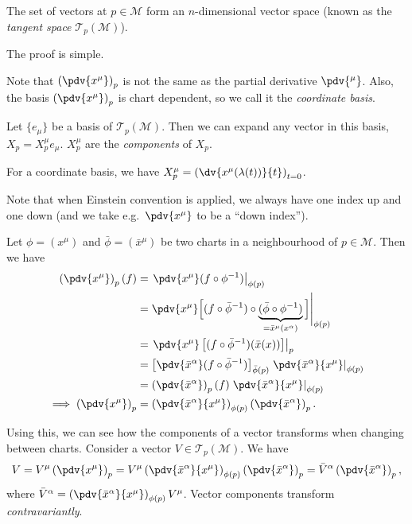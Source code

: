 \documentclass{jknotes}
\begin{document}
\begin{lemma}
    The set of vectors at \(p\in\mathcal{M}\) form an \(n\)-dimensional vector space (known as the \emph{tangent space} \(\mathcal{T}_p(\mathcal{M})\)).
\end{lemma}
The proof is simple.

Note that \(\left(\pdv{x^\mu}\right)_p\) is not the same as the partial derivative \(\pdv{^\mu}\). Also, the basis \(\left(\pdv{x^\mu}\right)_p\) is chart dependent, so we call it the \emph{coordinate basis}.

\begin{defn}
    Let \(\{e_\mu\}\) be a basis of \(\mathcal{T}_p(\mathcal{M})\). Then we can expand any vector in this basis, \(X_p = X_p^\mu e_\mu\). \(X_p^\mu\) are the \emph{components} of \(X_p\).
\end{defn}
\begin{eg}
    For a coordinate basis, we have \(X_p^\mu = \left(\dv{x^\mu(\lambda(t))}{t}\right)_{t=0}\).
\end{eg}
Note that when Einstein convention is applied, we always have one index up and one down (and we take e.g.\ \(\pdv{x^\mu}\) to be a ``down index'').

Let \(\phi=(x^\mu)\) and \(\bar\phi = (\bar{x}^\mu)\) be two charts in a neighbourhood of \(p\in \mathcal{M}\). Then we have
\begin{align}
    \left(\pdv{x^\mu}\right)_p(f) &= \left.\pdv{x^\mu}(f\circ\phi^{-1})\right|_{\phi(p)} \\
                                  &= \pdv{x^\mu}\Big[(f\circ\bar\phi^{-1})\circ\underbrace{(\bar\phi\circ\phi^{-1})}_{=\bar{x}^\mu(x^\alpha)}\Big]\Bigg|_{\phi(p)} \\
                                  &= \left.\pdv{x^\mu}\left[(f\circ\bar\phi^{-1})(\bar{x}(x))\right]\right|_{p} \\
                                  &= \left[\pdv{\bar{x}^\alpha}(f\circ\bar\phi^{-1})\right]_{\bar\phi(p)}\left.\pdv{\bar{x}^\alpha}{x^\mu}\right|_{\phi(p)} \\
                                  &= \left(\pdv{\bar{x}^\alpha}\right)_p(f) \left.\pdv{\bar{x}^\alpha}{x^\mu}\right|_{\phi(p)} \\
    \implies \left(\pdv{x^\mu}\right)_p &= \left(\pdv{\bar{x}^\alpha}{x^\mu}\right)_{\phi(p)}\left(\pdv{\bar{x}^\alpha}\right)_p.
\end{align}

Using this, we can see how the components of a vector transforms when changing between charts. Consider a vector \(V \in \mathcal{T}_p(\mathcal{M})\). We have
\begin{equation}
    V = V^\mu\left(\pdv{x^\mu}\right)_p = V^\mu\left(\pdv{\bar{x}^\alpha}{x^\mu}\right)_{\phi(p)}\left(\pdv{\bar{x}^\alpha}\right)_p = \bar{V}^\alpha\left(\pdv{\bar{x}^\alpha}\right)_p,
\end{equation}
where \(\bar{V}^\alpha = \left(\pdv{\bar{x}^\alpha}{x^\mu}\right)_{\phi(p)}V^\mu\). Vector components transform \emph{contravariantly}.
\end{document}

